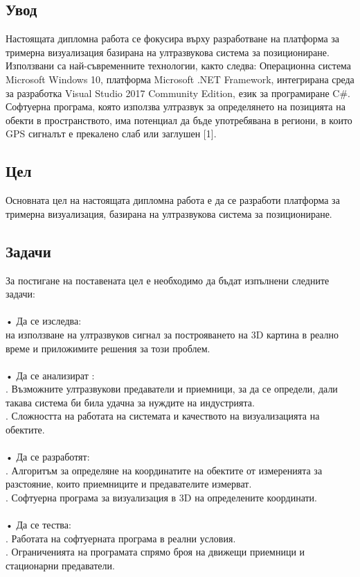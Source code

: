 \subsection{Увод}
Настоящата дипломна работа се фокусира върху разработване на платформа за тримерна визуализация базирана на ултразвукова система за позициониране. Използвани са най-съвременните технологии, както следва: Операционна система Microsoft Windows 10, платформа Microsoft .NET Framework, интегрирана среда за разработка Visual Studio 2017 Community Edition, език за програмиране C#. Софтуерна програма, която използва ултразвук за определянето на позицията на обекти в пространството, има потенциал да бъде употребявана в региони, в които GPS сигналът е прекалено слаб или заглушен [1].

\subsection{Цел}
Основната цел на настоящата дипломна работа е да се разработи платформа за тримерна визуализация, базирана на ултразвукова система за позициониране.

\subsection{Задачи}
За постигане на поставената цел е необходимо да бъдат изпълнени следните задачи:\\\\
•	Да се изследва:\\
 на използване на ултразвуков сигнал за построяването на 3D картина в реално време и приложимите решения за този проблем.\\\\
•	Да се анализират :\\
.	Възможните ултразвукови предаватели и приемници, за да се определи, дали такава система би била удачна за нуждите на индустрията.\\
.	Сложността на работата на системата и качеството на визуализацията на обектите.\\\\
•	Да се разработят:\\
.	Алгоритъм за определяне на координатите на обектите от измеренията за разстояние, които приемниците и предавателите измерват.\\
.	Софтуерна програма за визуализация в 3D на определените координати.\\\\
•	Да се тества:\\
.	Работата на софтуерната програма в реални условия.\\
.	Ограниченията на програмата спрямо броя на движещи приемници и стационарни предаватели.\\\\